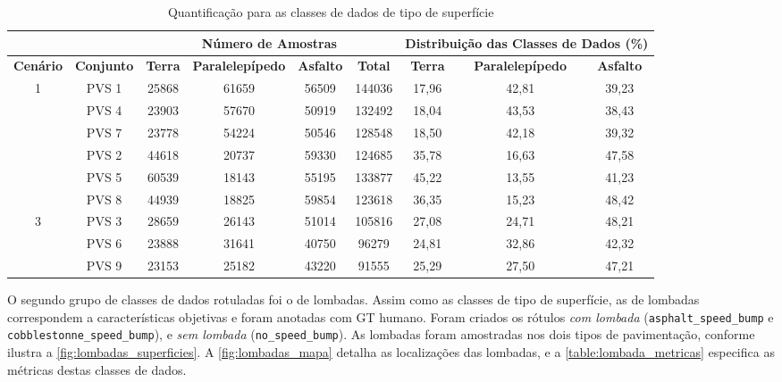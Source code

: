 \begin{table}[H]
\scriptsize
\centering
\caption{Quantificação para as classes de dados de tipo de superfície} 
\label{table:tipos_superficie_metricas}
\begin{tabular}{ccccccccc}
\cmidrule(l){3-9} & & 
\multicolumn{4}{c}{\textbf{Número de Amostras}} & 
\multicolumn{3}{c}{\textbf{Distribuição das Classes de Dados (\%)}} 
\\ \midrule

\multicolumn{1}{c}{\textbf{Cenário}} &
\textbf{Conjunto} &
\textbf{Terra} &
\textbf{Paralelepípedo} &
\textbf{Asfalto} & 
\textbf{Total} &
\textbf{Terra} &
\textbf{Paralelepípedo} &
\textbf{Asfalto}
\\ \midrule

\multicolumn{1}{c}{\multirow{4}{*}{1}} & PVS 1 & 25868 & 61659 & 56509 & 144036 & 17,96 & 42,81 & 39,23 \\ \cmidrule(l){2-9} 
\multicolumn{1}{c}{} & PVS 4 & 23903 & 57670 & 50919 & 132492 & 18,04 & 43,53 & 38,43 \\ \cmidrule(l){2-9} 
\multicolumn{1}{c}{} & PVS 7 & 23778 & 54224 & 50546 & 128548 & 18,50 & 42,18 & 39,32 \\ \midrule

\multicolumn{1}{c}{\multirow{4}{*}{2}} & PVS 2 & 44618 & 20737 & 59330 & 124685 & 35,78 & 16,63 & 47,58 \\ \cmidrule(l){2-9} 
\multicolumn{1}{c}{} & PVS 5 & 60539 & 18143 & 55195 & 133877 & 45,22 & 13,55 & 41,23 \\ \cmidrule(l){2-9} 
\multicolumn{1}{c}{} & PVS 8 & 44939 & 18825 & 59854 & 123618 & 36,35 & 15,23 & 48,42 \\ \midrule

\multicolumn{1}{c}{\multirow{4}{*}{3}} & PVS 3 & 28659 & 26143 & 51014 & 105816 & 27,08 & 24,71 & 48,21 \\ \cmidrule(l){2-9} 
\multicolumn{1}{c}{} & PVS 6 & 23888 & 31641 & 40750 & 96279 & 24,81 & 32,86 & 42,32 \\ \cmidrule(l){2-9} 
\multicolumn{1}{c}{} & PVS 9 & 23153 & 25182 & 43220 & 91555 & 25,29 & 27,50 & 47,21 \\ \bottomrule

\end{tabular}
\end{table}

O segundo grupo de classes de dados rotuladas foi o de lombadas. Assim como as classes de tipo de superfície, as de lombadas correspondem a características objetivas e foram anotadas com GT humano. Foram criados os rótulos \emph{com lombada} (\texttt{asphalt\_speed\_bump} e \texttt{cobblestonne\_speed\_bump}), e \emph{sem lombada} (\texttt{no\_speed\_bump}). As lombadas foram amostradas nos dois tipos de pavimentação, conforme ilustra a \autoref{fig:lombadas_superficies}. A \autoref{fig:lombadas_mapa} detalha as localizações das lombadas, e a \autoref{table:lombada_metricas} especifica as métricas destas classes de dados.

